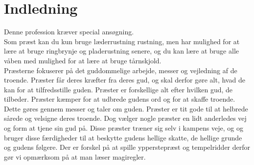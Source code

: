 \chapter*{Indledning}
Denne profession kræver special ansøgning.\\
Som præst kan du kun bruge læderrustning rustning, men har mulighed for at lære at bruge ringbrynje og pladerustning senere, og du kan lære at bruge alle våben med mulighed for at lære at bruge tårnskjold.\\

Præsterne fokuserer på det guddommelige arbejde, messer og vejledning af de troende.
Præster får deres kræfter fra deres gud, og skal derfor gøre alt, hvad de kan for at tilfredsstille
guden. Præster er forskellige alt efter hvilken gud, de tilbeder. Præster kæmper for at
udbrede gudens ord og for at skaffe troende. Dette gøres gennem messer og taler om
guden. Præster er tit gode til at helbrede sårede og velsigne deres troende. Dog vælger nogle præster
en lidt anderledes vej og form at tjene sin gud på. Disse præster træner sig selv i kampens veje, og og
bruger disse færdigheder til at beskytte gudens hellige skatte, de hellige grunde og gudens følgere.
Der er forskel på at spille ypperstepræst og tempelridder derfor gør vi opmærksom på at man
læser magiregler.

